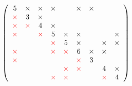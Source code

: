 \begin{frame}[fragile]
  \begin{align*} 
   \left(
   \begin{array}{ccccccccc}
     \textstyle 5 &  \textstyle \times & \textstyle \times     & \textstyle \times  &   & \textstyle \times     & \textstyle \times &   &   \\
     \textstyle \color{red} \times & \textstyle 3 & \textstyle \times      &    &   &      &   &  &   \\
    \textstyle \color{red} \times & \textstyle \color{red} \times & \textstyle 4     & \textstyle \times  &   &       &   &   &   \\
%
    \textstyle \color{red} \times &   &  \textstyle\color{red}  \times     & \textstyle 5  & \textstyle \times & \textstyle \times     &   &   & \textstyle \times \\
      &   &       & \textstyle \color{red} \times  & \textstyle 5 & \textstyle \times     &   & \textstyle \times & \textstyle \times \\
    \textstyle \color{red} \times &   &      & \textstyle \color{red} \times  & \textstyle \color{red} \times & \textstyle 6     & \textstyle \times & \textstyle \times &  \\
%
    \textstyle \color{red} \times &  &       &    &   & \textstyle\color{red}  \times     & \textstyle 3 &   &   \\
      &   &       &    & \textstyle\color{red}  \times & \textstyle \color{red} \times    &   & \textstyle 4 & \textstyle \times \\
      &   &      & \textstyle\color{red}  \times  & \textstyle \color{red} \times &      &   & \textstyle \color{red} \times & \textstyle 4 \\
   \end{array}
         \right)
  \end{align*}

 
\end{frame}






